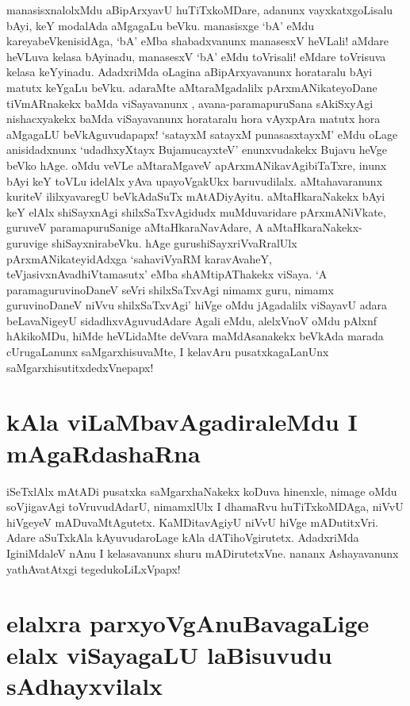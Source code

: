 manasisxnalolxMdu aBipArxyavU huTiTxkoMDare, adanunx vayxkatxgoLisalu bAyi, keY modalAda aMgagaLu beVku. manasisxge `bA' eMdu kareyabeVkenisidAga, `bA' eMba shabadxvanunx manasesxV heVLali! aMdare heVLuva kelasa bAyinadu, manasesxV `bA' eMdu toVrisali! eMdare toVrisuva kelasa keYyinadu. AdadxriMda oLagina aBipArxyavanunx horataralu bAyi matutx keYgaLu beVku. adaraMte aMtaraMgadalilx pArxmANikateyoDane tiVmARnakekx baMda viSayavanunx , avana-paramapuruSana sAkiSxyAgi nishacxyakekx baMda viSayavanunx horataralu hora vAyxpAra matutx hora aMgagaLU beVkAguvudapapx! `satayxM satayxM punasasxtayxM'\label{130a} eMdu oLage anisidadxnunx `udadhxyXtayx BujamucayxteV'\label{130} enunxvudakekx Bujavu heVge beVko hAge. oMdu veVLe aMtaraMgaveV apArxmANikavAgibiTaTxre, inunx bAyi keY toVLu idelAlx yAva upayoVgakUkx baruvudilalx. aMtahavaranunx kuriteV ililxyavaregU beVkAdaSuTx mAtADiyAyitu. aMtaHkaraNakekx bAyi keY elAlx shiSayxnAgi shilxSaTxvAgidudx muMduvaridare pArxmANiVkate, guruveV paramapuruSanige aMtaHkaraNavAdare, A aMtaHkaraNakekx- guruvige shiSayxnirabeVku. hAge gurushiSayxriVvaRralUlx pArxmANikateyidAdxga `sahaviVyaRM karavAvaheY, teVjasivxnAvadhiVtamasutx'  eMba shAMtipAThakekx viSaya. `A paramaguruvinoDaneV seVri shilxSaTxvAgi nimamx guru, nimamx guruvinoDaneV niVvu shilxSaTxvAgi' hiVge oMdu jAgadalilx viSayavU adara beLavaNigeyU sidadhxvAguvudAdare Agali eMdu, alelxVnoV oMdu pAlxnf hAkikoMDu, hiMde heVLidaMte deVvara maMdAsanakekx beVkAda marada cUrugaLanunx saMgarxhisuvaMte, I kelavAru pusatxkagaLanUnx saMgarxhisutitxdedxVnepapx!

\section*{kAla viLaMbavAgadiraleMdu I mAgaRdashaRna}

iSeTxlAlx mAtADi pusatxka saMgarxhaNakekx koDuva hinenxle, nimage oMdu soVjigavAgi toVruvudAdarU, nimamxlUlx I dhamaRvu huTiTxkoMDAga, niVvU hiVgeyeV mADuvaMtAgutetx. KaMDitavAgiyU niVvU hiVge mADutitxVri. Adare aSuTxkAla kAyuvudaroLage kAla dATihoVgirutetx. AdadxriMda IginiMdaleV nAnu I kelasavanunx shuru mADirutetxVne. nananx Ashayavanunx yathAvatAtxgi tegedukoLiLxVpapx!

\section*{elalxra parxyoVgAnuBavagaLige elalx viSayagaLU laBisuvudu sAdhayxvilalx}

